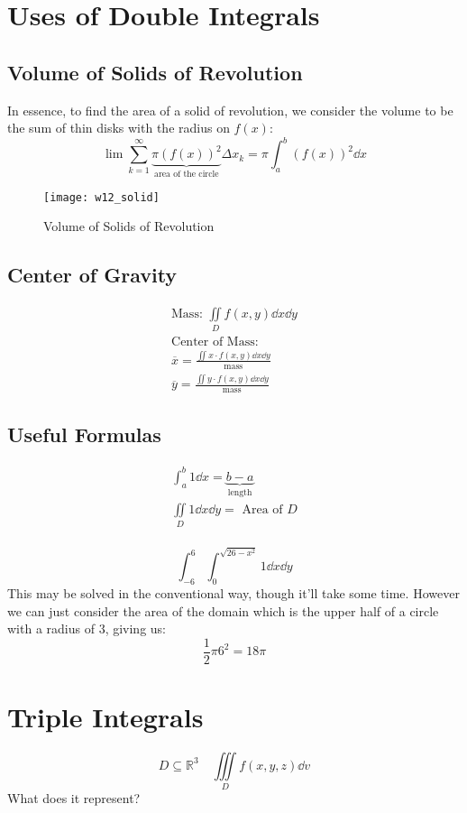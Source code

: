 \section{Uses of Double Integrals}

\subsection{Volume of Solids of Revolution}

In essence, to find the area of a solid of revolution, we consider the volume
to be the sum of thin disks with the radius on $f(x)$:
$$\lim \sum_{k=1}^{\infty} \underbrace{\pi(f(x))^2}_{\text{area of the
circle}}\Delta x_k=\pi\int_{a}^{b}(f(x))^2\dd{x}$$
    \begin{figure}[ht]
    \centering
    \texttt{[image: w12\_solid]}
    \caption{Volume of Solids of Revolution}
    \end{figure}
\subsection{Center of Gravity}

\begin{gather*}
    \text{Mass: } \iint\limits_D f(x,y)\dd{x}\dd{y} \\
    \text{Center of Mass:} \\
    \overline x = \frac{\iint x\cdot f(x,y)\dd{x}\dd{y}}{\text{mass}} \\
    \overline y = \frac{\iint y\cdot f(x,y)\dd{x}\dd{y}}{\text{mass}}
\end{gather*}
\subsection{Useful Formulas}
\begin{gather*}
    \int_{a}^{b}1\dd{x}=\underbrace{b-a}_{\text{length}} \\
    \iint\limits_D 1\dd{x}\dd{y}=\text{ Area of $D$} \\
\end{gather*}
\begin{example}
    $$\int_{-6}^{6}\int_{0}^{\sqrt{26-x^2}}1\dd{x}\dd{y}$$
    This may be solved in the conventional way, though it'll take some time.
    However we can just consider the area of the domain which is the upper
    half of a circle with a radius of $3$, giving us:
    $$\frac{1}{2}\pi 6^2 = 18\pi$$
\end{example}
\section{Triple Integrals}
$$D \subseteq \mathbb{R}^3 \quad \iiint\limits_Df(x,y,z)\dd{v}$$
What does it represent?

